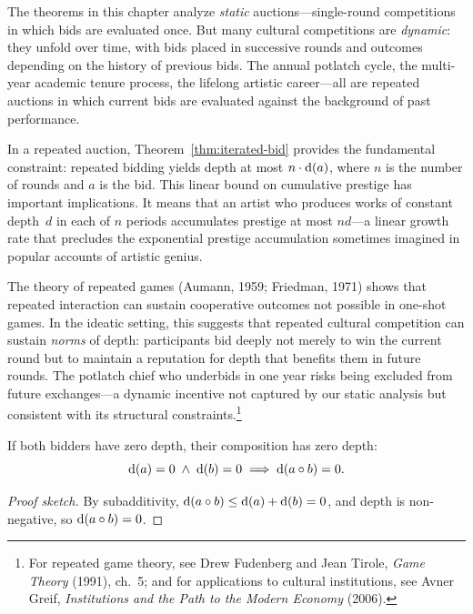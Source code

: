 \begin{remark}
\label{rem:dynamic-auctions}
The theorems in this chapter analyze \emph{static} auctions---single-round
competitions in which bids are evaluated once.  But many cultural
competitions are \emph{dynamic}: they unfold over time, with bids placed
in successive rounds and outcomes depending on the history of previous
bids.  The annual potlatch cycle, the multi-year academic tenure process,
the lifelong artistic career---all are repeated auctions in which current
bids are evaluated against the background of past performance.

In a repeated auction, Theorem~\ref{thm:iterated-bid} provides the
fundamental constraint: repeated bidding yields depth at most
$n \cdot \operatorname{d}(a)$, where $n$ is the number of rounds and $a$ is the
bid.  This linear bound on cumulative prestige has important implications.
It means that an artist who produces works of constant depth~$d$ in each
of $n$ periods accumulates prestige at most $nd$---a linear growth rate
that precludes the exponential prestige accumulation sometimes imagined
in popular accounts of artistic genius.

The theory of repeated games (Aumann, 1959; Friedman, 1971) shows that
repeated interaction can sustain cooperative outcomes not possible in
one-shot games.  In the ideatic setting, this suggests that repeated
cultural competition can sustain \emph{norms} of depth: participants
bid deeply not merely to win the current round but to maintain a reputation
for depth that benefits them in future rounds.  The potlatch chief who
underbids in one year risks being excluded from future exchanges---a
dynamic incentive not captured by our static analysis but consistent with
its structural constraints.\footnote{For repeated game theory, see Drew
Fudenberg and Jean Tirole, \textit{Game Theory} (1991), ch.~5; and for
applications to cultural institutions, see Avner Greif, \textit{Institutions
and the Path to the Modern Economy} (2006).}
\end{remark}

\begin{theorem}
\label{thm:zero-depth-comp}
If both bidders have zero depth, their composition has zero depth:
\[
  \operatorname{d}(a) = 0 \;\wedge\; \operatorname{d}(b) = 0
  \;\Longrightarrow\;
  \operatorname{d}(a \circ b) = 0.
\]
\end{theorem}

\begin{proof}[Proof sketch]
By subadditivity, $\operatorname{d}(a \circ b) \le \operatorname{d}(a) + \operatorname{d}(b) = 0$,
and depth is non-negative, so $\operatorname{d}(a \circ b) = 0$.
\end{proof}

